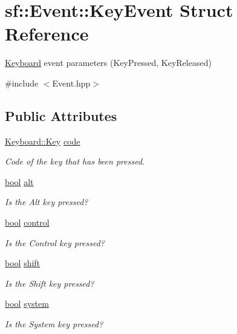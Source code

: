 \hypertarget{structsf_1_1_event_1_1_key_event}{\section{sf\-:\-:Event\-:\-:Key\-Event Struct Reference}
\label{structsf_1_1_event_1_1_key_event}
}


\hyperlink{classsf_1_1_keyboard}{Keyboard} event parameters (Key\-Pressed, Key\-Released)  




{\ttfamily \#include $<$Event.\-hpp$>$}

\subsection*{Public Attributes}
\begin{DoxyCompactItemize}
\item 
\hyperlink{classsf_1_1_keyboard_acb4cacd7cc5802dec45724cf3314a142}{Keyboard\-::\-Key} \hyperlink{structsf_1_1_event_1_1_key_event_a2879fdab8a68cb1c6ecc45730a2d0e61}{code}
\begin{DoxyCompactList}\small\item\em Code of the key that has been pressed. \end{DoxyCompactList}\item 
\hyperlink{term__entry_8h_a002004ba5d663f149f6c38064926abac}{bool} \hyperlink{structsf_1_1_event_1_1_key_event_a915a483317de67d995188a855701fbd7}{alt}
\begin{DoxyCompactList}\small\item\em Is the Alt key pressed? \end{DoxyCompactList}\item 
\hyperlink{term__entry_8h_a002004ba5d663f149f6c38064926abac}{bool} \hyperlink{structsf_1_1_event_1_1_key_event_a9255861c2f88501d80ad6b44a310b62f}{control}
\begin{DoxyCompactList}\small\item\em Is the Control key pressed? \end{DoxyCompactList}\item 
\hyperlink{term__entry_8h_a002004ba5d663f149f6c38064926abac}{bool} \hyperlink{structsf_1_1_event_1_1_key_event_a776af1a3ca79abeeec18ebf1c0065aa9}{shift}
\begin{DoxyCompactList}\small\item\em Is the Shift key pressed? \end{DoxyCompactList}\item 
\hyperlink{term__entry_8h_a002004ba5d663f149f6c38064926abac}{bool} \hyperlink{structsf_1_1_event_1_1_key_event_ac0557f7edc2a608ec65175fdd843afc5}{system}
\begin{DoxyCompactList}\small\item\em Is the System key pressed? \end{DoxyCompactList}\end{DoxyCompactItemize}


